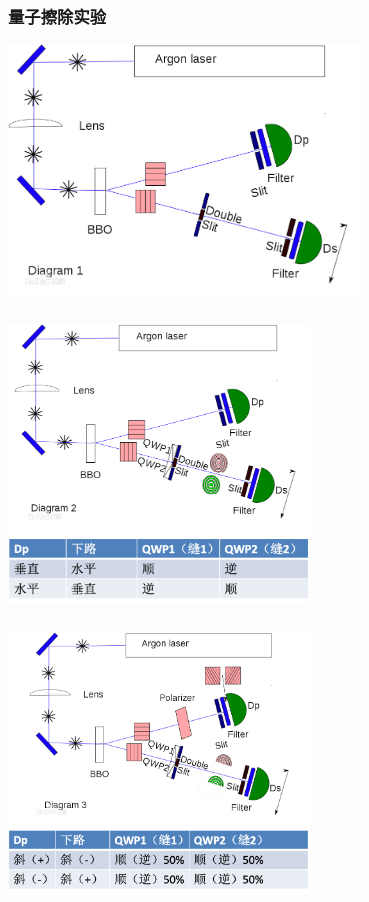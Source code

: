  \begin{frame}
     \frametitle{量子擦除实验}
     \begin{center}
         \includegraphics[width=0.7\textwidth]{figs/c1.png} \\
     \end{center} 
 \end{frame}
 
 \begin{frame}
     \frametitle{}
     \begin{center}
         \includegraphics[width=0.6\textwidth]{figs/c2.png} \\
     \end{center} 
 \end{frame}
 
 \begin{frame}
     \frametitle{}
     \begin{center}
         \includegraphics[width=0.6\textwidth]{figs/c3.png} \\
     \end{center} 
 \end{frame}
 
